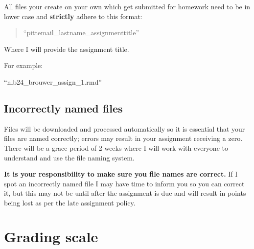 \documentclass[
]{book}
\begin{document}
All files your create on your own which get submitted for homework need to be in lower case and \textbf{strictly} adhere to this format:

\begin{quote}
``pittemail\_lastname\_assignmenttitle''
\end{quote}

Where I will provide the assignment title.

For example:

``nlb24\_brouwer\_assign\_1.rmd''

\hypertarget{incorrectly-named-files}{%
\section{Incorrectly named files}\label{incorrectly-named-files}}

Files will be downloaded and processed automatically so it is essential that your files are named correctly; errors may result in your assignment receiving a zero. There will be a grace period of 2 weeks where I will work with everyone to understand and use the file naming system.

\textbf{It is your responsibility to make sure you file names are correct.} If I spot an incorrectly named file I may have time to inform you so you can correct it, but this may not be until after the assignment is due and will result in points being lost as per the late assignment policy.

\hypertarget{grading-scale}{%
\chapter{Grading scale}\label{grading-scale}}
\end{document}
